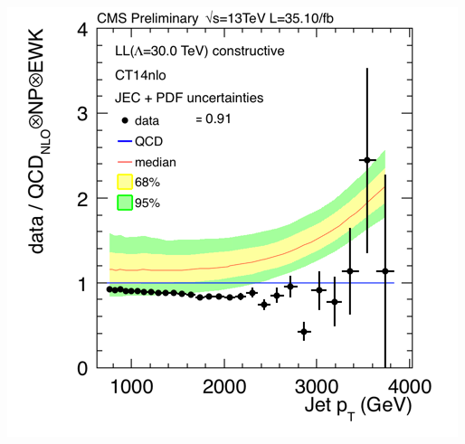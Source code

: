 \documentclass[t,professionalfonts,handout, xcolor=pdftex,dvipsnames,table]{beamer}
\begin{document}
\begin{frame}
\begin{columns}[T]
\begin{column}{0.49\textwidth}
\includegraphics[width=\textwidth]{xsection_LL_ratio.png}
\end{column}

\end{columns}

\end{frame}

\end{document}
